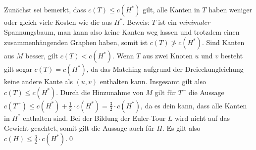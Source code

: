 \documentclass[a4paper]{article}
\begin{document}
	\maketitle
	\section{}
		Zunächst sei bemerkt, dass $c(T)\leq c(H^*)$ gilt, alle Kanten in $T$ haben weniger oder gleich viele Kosten wie die aus $H^*$.\n
		Beweis: $T$ ist ein \textit{minimaler} Spannungsbaum, man kann also keine Kanten weg lassen und trotzdem einen zusammenhängenden Graphen haben, somit ist $c(T)\not> c(H^*)$.
		Sind Kanten aus $M$ besser, gilt $c(T)<c(H^*)$.
		Wenn $T$ aus zwei Knoten $u$ und $v$ besteht gilt sogar $c(T)=c(H^*)$, da das Matching aufgrund der Dreieckungleichung keine andere Kante als $(u,v)$ enthalten kann.
		Insgesamt gilt also $c(T)\leq c(H^*)$.\n
		Durch die Hinzunahme von $M$ gilt für $T^+$ die Aussage $c(T^+)\leq c(H^*)+\frac{1}{2}\cdot c(H^*)=\frac{3}{2}\cdot c(H^*)$, da es dein kann, dass alle Kanten in $H^*$ enthalten sind.
		Bei der Bildung der Euler-Tour $L$ wird nicht auf das Gewicht geachtet, somit gilt die Aussage auch für $H$.\n
		Es gilt also $c(H)\leq \frac{3}{2}\cdot c(H^*)$.\qed
	\section{}
\end{document}
